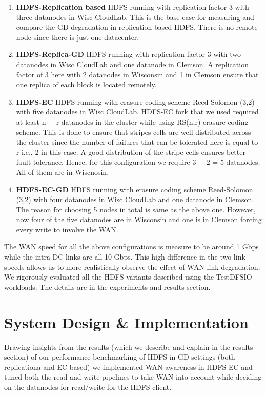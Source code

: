 \documentclass{sig-alternate-05-2015}
\begin{document}
\begin{enumerate}
  \item \textbf{HDFS-Replication based} HDFS running with replication factor 3 with three datanodes in Wisc CloudLab. This is the base case for measuring  and compare the GD degradation in replication based HDFS. There is no remote node since there is just one datacenter.  
	\item \textbf{HDFS-Replica-GD} HDFS running with replication factor 3 with two datanodes in Wisc CloudLab and one datanode in Clemson. A replication factor of 3 here with 2 datanodes in Wisconsin and 1 in Clemson ensure that one replica of each block is located remotely.
	\item \textbf{HDFS-EC} HDFS running with erasure coding scheme Reed-Solomon (3,2) with five datanodes in Wisc CloudLab. HDFS-EC fork that we used required at least n + r datanodes in the cluster while using  RS(n,r) erasure coding scheme. This is done to ensure that stripes cells are well distributed across the cluster since the number of failures that can be tolerated here is equal to r i.e., 2 in this case. A good distribution of the stripe cells ensures better fault tolerance.  Hence, for this configuration we require 3 + 2 = 5 datanodes. All of them are in Wiscnosin.
	\item \textbf{HDFS-EC-GD} HDFS running with erasure coding scheme Reed-Solomon (3,2) with four datanodes in Wisc CloudLab and one datanode in Clemson. The reason for choosing 5 nodes in total is same as the above one. However, now four of the five datanodes are in Wisconsin and one is in Clemson forcing every write to involve the WAN. 
  \end{enumerate}
The WAN speed for all the above configurations is measure to be around 1 Gbps while the intra DC links are all 10 Gbps. This high difference in the two link speeds allows us to more realistically observe the effect of WAN link degradation. We rigorously evaluated all the HDFS variants described using the TestDFSIO workloads. The details are in the experiments and results section. 

\section{System Design \& Implementation}
Drawing insights from the results (which we describe and explain in the results section) of our performance benchmarking of HDFS in GD settings (both replicationa and EC based)  we implemented WAN awareness in HDFS-EC and tuned both the read and write pipelines to take WAN into account while deciding on the datanodes for read/write for the HDFS client. 
\end{document}
